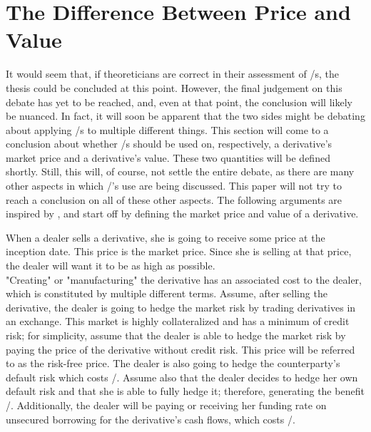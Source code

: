 \documentclass[main.tex]{subfiles}
\begin{document}
    \section{The Difference Between Price and Value}
    \label{sec:price-versus-value}

    It would seem that, if theoreticians are correct in their assessment of \FVA/s,
    the thesis could be concluded at this point.
    However, the final judgement on this debate has yet to be reached,
    and, even at that point, the conclusion will likely be nuanced.
    In fact, it will soon be apparent that the two sides might be debating
    about applying \FVA/s to multiple different things.
    This section will come to a conclusion about whether \FVA/s should be used
    on, respectively, a derivative's market price and a derivative's value.
    These two quantities will be defined shortly. 
    Still, this will, of course, not settle the entire debate,
    as there are many other aspects in which \FVA/'s use are being discussed.
    This paper will not try to reach a conclusion on all of these other aspects.
    The following arguments are inspired by \textcite{Ruiz2015XVA},
    and start off by defining the market price and value of a derivative.

    When a dealer sells a derivative, she is going to receive some price at the inception date.
    This price is the market price.
    Since she is selling at that price, the dealer will want it to be as high as possible.
    \\
    "Creating" or "manufacturing" the derivative has an associated cost to the dealer,
    which is constituted by multiple different terms.
    Assume, after selling the derivative, the dealer is going to hedge the market risk
    by trading derivatives in an exchange.
    This market is highly collateralized and has a minimum of credit risk;
    for simplicity, assume that the dealer is able to hedge the market risk by paying
    the price of the derivative without credit risk. 
    This price will be referred to as the risk-free price.
    The dealer is also going to hedge the counterparty's default risk which costs \CVA/.
    Assume also that the dealer decides to hedge her own default risk
    and that she is able to fully hedge it; therefore, generating the benefit \DVA/.
    Additionally, the dealer will be paying or receiving her funding rate on unsecured borrowing
    for the derivative's cash flows, which costs \FVA/.
    
\end{document}
